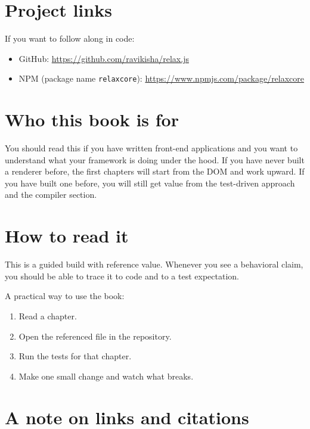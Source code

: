 \section*{Project links}

If you want to follow along in code:

\begin{itemize}
  \item GitHub: \href{https://github.com/ravikisha/relax.js}{https://github.com/ravikisha/relax.js}
  \item NPM (package name \texttt{relaxcore}): \href{https://www.npmjs.com/package/relaxcore}{https://www.npmjs.com/package/relaxcore}
\end{itemize}

\section*{Who this book is for}

You should read this if you have written front-end applications and you want to understand what your framework is doing under the hood.
If you have never built a renderer before, the first chapters will start from the DOM and work upward.
If you have built one before, you will still get value from the test-driven approach and the compiler section.

\section*{How to read it}

This is a guided build with reference value.
Whenever you see a behavioral claim, you should be able to trace it to code and to a test expectation.

A practical way to use the book:

\begin{enumerate}
  \item Read a chapter.
  \item Open the referenced file in the repository.
  \item Run the tests for that chapter.
  \item Make one small change and watch what breaks.
\end{enumerate}

\section*{A note on links and citations}

